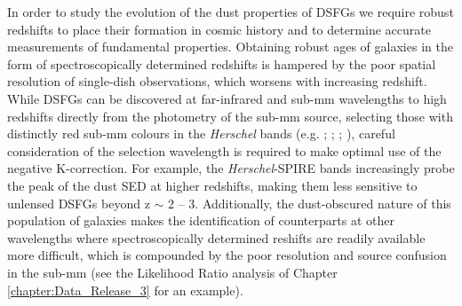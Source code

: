 In order to study the evolution of the dust properties of DSFGs we require robust redshifts to place their formation in cosmic history and to determine accurate measurements of fundamental properties. Obtaining robust ages of galaxies in the form of spectroscopically determined redshifts is hampered by the poor spatial resolution of single-dish observations, which worsens with increasing redshift. While DSFGs can be discovered at far-infrared and sub-mm wavelengths to high redshifts directly from the photometry of the sub-mm source, selecting those with distinctly red sub-mm colours in the \textit{Herschel} bands (e.g. \citealt{Dowell_2014}; \citealt{Ivison_2016}; \citealt{Donevski_2018}; \citealt{Duivenvoorden_2018}), careful consideration of the selection wavelength is required to make optimal use of the negative K-correction. For example, the \textit{Herschel}-SPIRE bands increasingly probe the peak of the dust SED at higher redshifts, making them less sensitive to unlensed DSFGs beyond z $\sim$ 2 -- 3. Additionally, the dust-obscured nature of this population of galaxies makes the identification of counterparts at other wavelengths where spectroscopically determined reshifts are readily available more difficult, which is compounded by the poor resolution and source confusion in the sub-mm (see the Likelihood Ratio analysis of Chapter \ref{chapter:Data_Release_3} for an example).

